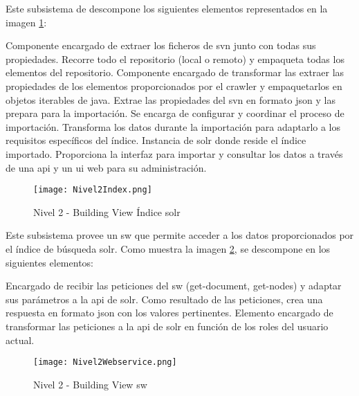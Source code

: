 Este subsistema de descompone los siguientes elementos representados en la imagen \ref{image:level2-solr}:
\begin{itemize}
    Componente encargado de extraer los ficheros de \gls{svn} junto con todas sus propiedades. Recorre todo el repositorio (local o remoto) y empaqueta todas los elementos del repositorio.
    Componente encargado de transformar las extraer las propiedades de los elementos proporcionados por el crawler y empaquetarlos en objetos iterables de \gls{java}.
	Extrae las propiedades del \gls{svn} en formato \gls{json} y las prepara para la importación.
    Se encarga de configurar y coordinar el proceso de importación.
    Transforma los datos durante la importación para adaptarlo a los requisitos específicos del índice.
    Instancia de \gls{solr} donde reside el índice importado. Proporciona la interfaz para importar y consultar los datos a través de una \gls{api} y un \gls{ui} web para su administración.
\end{itemize}

\begin{figure}[H]
  \centering
     \texttt{[image: Nivel2Index.png]}
  \caption{Nivel 2 - Building View Índice \gls{solr}}
  \label{image:level2-solr}
\end{figure}


Este subsistema provee un \gls{sw} que permite acceder a los datos proporcionados por el índice de búsqueda \gls{solr}. Como muestra la imagen \ref{image:level2-sw}, se descompone en los siguientes elementos:
\begin{itemize}
    Encargado de recibir las peticiones del \gls{sw} (get-document, get-nodes) y adaptar sus parámetros a la \gls{api} de \gls{solr}. Como resultado de las peticiones, crea una respuesta en formato \gls{json} con los valores pertinentes.
    Elemento encargado de transformar las peticiones a la \gls{api} de \gls{solr} en función de los roles del usuario actual. 
\end{itemize}

\begin{figure}[H]
  \centering
     \texttt{[image: Nivel2Webservice.png]}
  \caption{Nivel 2 - Building View \Gls{sw}}
  \label{image:level2-sw}
\end{figure}

